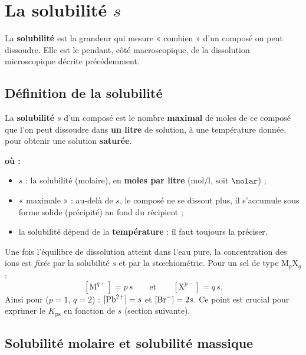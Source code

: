 \documentclass[11pt,a4paper]{article}
\newenvironment{ou}{%
  \par\smallskip\noindent\textbf{où :}\nopagebreak
  \begin{itemize}[leftmargin=1.8em,topsep=2pt,itemsep=1.5pt,parsep=0pt]}%
  {\end{itemize}}
\newcommand{\Kps}{K_{\mathrm{ps}}}
\begin{document}
\section{La solubilité \texorpdfstring{$s$}{s}}
La \textbf{solubilité} est la grandeur qui mesure « combien » d'un composé on peut dissoudre. Elle est
le pendant, côté macroscopique, de la dissolution microscopique décrite précédemment.

\subsection{Définition de la solubilité}

\begin{definition}[solubilité]
La \textbf{solubilité} $s$ d'un composé est le nombre \textbf{maximal} de moles de ce composé que l'on
peut dissoudre dans \textbf{un litre} de solution, à une température donnée, pour obtenir une solution
\textbf{saturée}.
\end{definition}

\begin{ou}
  \item $s$ : la solubilité (molaire), en \textbf{moles par litre} ($\si{\mole\per\litre}$, soit
        $\si{\molar}$) ;
  \item « maximale » : au-delà de $s$, le composé ne se dissout plus, il s'accumule sous forme solide
        (précipité) au fond du récipient ;
  \item la solubilité dépend de la \textbf{température} : il faut toujours la préciser.
\end{ou}

\begin{remarque}
Une fois l'équilibre de dissolution atteint dans l'eau pure, la concentration des ions est
\emph{fixée} par la solubilité $s$ et par la stœchiométrie. Pour un sel de type
$\mathrm{M}_p\mathrm{X}_q$ :
\[ [\mathrm{M}^{q+}] = p\,s \qquad\text{et}\qquad [\mathrm{X}^{p-}] = q\,s. \]
Ainsi pour  ($p=1$, $q=2$) : $[\ce{Pb^{2+}}]=s$ et $[\ce{Br-}]=2s$. Ce point est crucial pour
exprimer le $\Kps$ en fonction de $s$ (section suivante).
\end{remarque}

\subsection{Solubilité molaire et solubilité massique}
\end{document}
